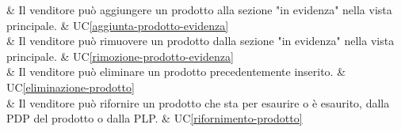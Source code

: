  & Il venditore può aggiungere un prodotto alla sezione "in evidenza" nella vista principale. & UC\ref{aggiunta-prodotto-evidenza} \\

 & Il venditore può rimuovere un prodotto dalla sezione "in evidenza" nella vista principale. & UC\ref{rimozione-prodotto-evidenza} \\
    
 & Il venditore può eliminare un prodotto precedentemente inserito. & UC\ref{eliminazione-prodotto} \\

 & Il venditore può rifornire un prodotto che sta per esaurire o è esaurito, dalla PDP del prodotto o dalla PLP. & UC\ref{rifornimento-prodotto} \\

